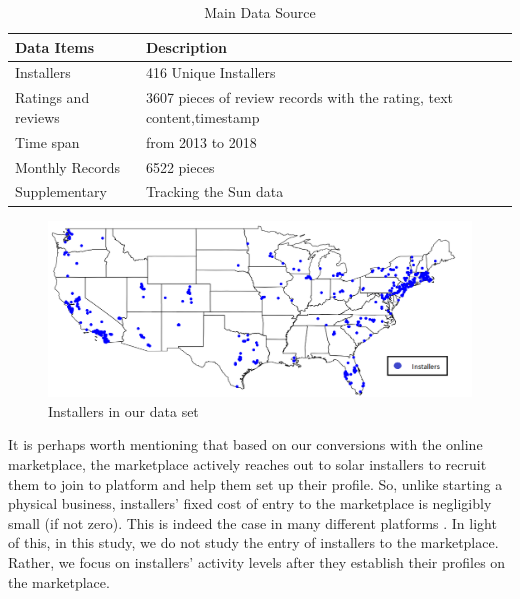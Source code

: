 \documentclass[msom,blindrev]{informs3}
\begin{document}
\begin{table}[]
\centering
\begin{tabular}{@{}ll@{}}
\toprule
Data Items & Description           \\ \midrule
Installers & 416 Unique Installers \\
Ratings and reviews & 3607 pieces of review records with the rating, text content,timestamp \\
Time span  & from 2013 to 2018     \\
Monthly Records & 6522 pieces \\
Supplementary & Tracking the Sun data \\
\bottomrule
\end{tabular}
\caption{Main Data Source}
\label{brief_data_desc}
\end{table}






\begin{figure}
	\centering
	\includegraphics[width=1.1\linewidth]{national_installers.png}
	\caption{Installers in our data set}
	\label{fig: nationalinstallers}
\end{figure}

It is perhaps worth mentioning that based on our conversions with the online marketplace, the marketplace actively reaches out to solar installers to recruit them to join to platform and help them set up their profile. So, unlike starting a physical business, installers' fixed cost of entry to the marketplace is negligibly small (if not zero). This is indeed the case in many different platforms \citep{haddad2015consumer}. In light of this, in this study, we do not study the entry of installers to the marketplace. Rather, we focus on installers' activity levels after they establish their profiles on the marketplace.


\end{document}

